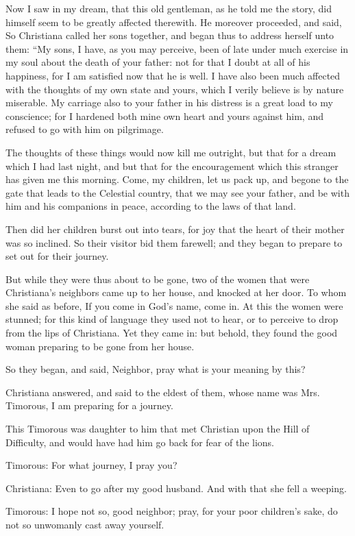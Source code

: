 Now I saw in my dream, that this old gentleman, as he told me the story, did himself seem to be greatly affected therewith. He moreover proceeded, and said, So Christiana called her sons together, and began thus to address herself unto them: ``My sons, I have, as you may perceive, been of late under much exercise in my soul about the death of your father: not for that I doubt at all of his happiness, for I am satisfied now that he is well. I have also been much affected with the thoughts of my own state and yours, which I verily believe is by nature miserable. My carriage also to your father in his distress is a great load to my conscience; for I hardened both mine own heart and yours against him, and refused to go with him on pilgrimage.

The thoughts of these things would now kill me outright, but that for a dream which I had last night, and but that for the encouragement which this stranger has given me this morning. Come, my children, let us pack up, and begone to the gate that leads to the Celestial country, that we may see your father, and be with him and his companions in peace, according to the laws of that land.

Then did her children burst out into tears, for joy that the heart of their mother was so inclined. So their visitor bid them farewell; and they began to prepare to set out for their journey.

But while they were thus about to be gone, two of the women that were Christiana's neighbors came up to her house, and knocked at her door. To whom she said as before, If you come in God's name, come in. At this the women were stunned; for this kind of language they used not to hear, or to perceive to drop from the lips of Christiana. Yet they came in: but behold, they found the good woman preparing to be gone from her house.

So they began, and said, Neighbor, pray what is your meaning by this?

Christiana answered, and said to the eldest of them, whose name was Mrs. Timorous, I am preparing for a journey.

This Timorous was daughter to him that met Christian upon the Hill of Difficulty, and would have had him go back for fear of the lions.

Timorous: For what journey, I pray you?

Christiana: Even to go after my good husband. And with that she fell a weeping.

Timorous: I hope not so, good neighbor; pray, for your poor children's sake, do not so unwomanly cast away yourself.

